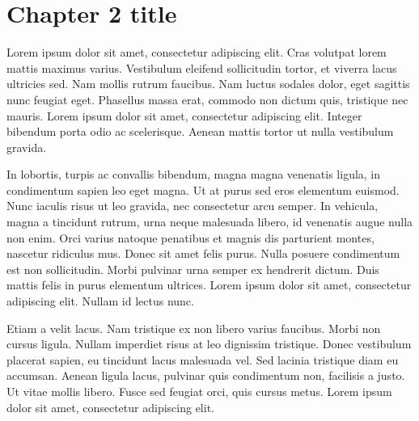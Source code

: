\documentclass[../book/book.tex]{subfiles}
\begin{document}
\chapter{Chapter 2 title}

Lorem ipsum dolor sit amet, consectetur adipiscing elit. Cras volutpat lorem mattis maximus varius. Vestibulum eleifend sollicitudin tortor, et viverra lacus ultricies sed. Nam mollis rutrum faucibus. Nam luctus sodales dolor, eget sagittis nunc feugiat eget. Phasellus massa erat, commodo non dictum quis, tristique nec mauris. Lorem ipsum dolor sit amet, consectetur adipiscing elit. Integer bibendum porta odio ac scelerisque. Aenean mattis tortor ut nulla vestibulum gravida.

In lobortis, turpis ac convallis bibendum, magna magna venenatis ligula, in condimentum sapien leo eget magna. Ut at purus sed eros elementum euismod. Nunc iaculis risus ut leo gravida, nec consectetur arcu semper. In vehicula, magna a tincidunt rutrum, urna neque malesuada libero, id venenatis augue nulla non enim. Orci varius natoque penatibus et magnis dis parturient montes, nascetur ridiculus mus. Donec sit amet felis purus. Nulla posuere condimentum est non sollicitudin. Morbi pulvinar urna semper ex hendrerit dictum. Duis mattis felis in purus elementum ultrices. Lorem ipsum dolor sit amet, consectetur adipiscing elit. Nullam id lectus nunc.

Etiam a velit lacus. Nam tristique ex non libero varius faucibus. Morbi non cursus ligula. Nullam imperdiet risus at leo dignissim tristique. Donec vestibulum placerat sapien, eu tincidunt lacus malesuada vel. Sed lacinia tristique diam eu accumsan. Aenean ligula lacus, pulvinar quis condimentum non, facilisis a justo. Ut vitae mollis libero. Fusce sed feugiat orci, quis cursus metus. Lorem ipsum dolor sit amet, consectetur adipiscing elit.
\end{document}
